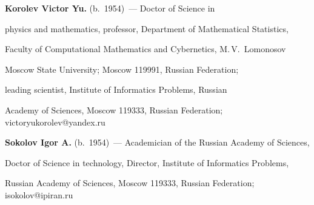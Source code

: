 \noindent


\textbf{Korolev Victor Yu.} (b.\ 1954)~--- Doctor of Science in 


physics and mathematics, professor, Department of Mathematical Statistics, 


Faculty of Computational Mathematics and Cybernetics, M.\,V.~Lomonosov


 Moscow State University; Moscow 119991, Russian Federation;


 leading scientist, Institute of Informatics Problems, Russian 


Academy of Sciences, Moscow 119333, Russian Federation; victoryukorolev@yandex.ru 





\vspace*{3pt}





\noindent


\textbf{Sokolov Igor A.} (b.\ 1954)~--- Academician of the Russian Academy of Sciences, 


Doctor of Science in technology, Director, Institute of Informatics Problems, 


Russian Academy of Sciences, Moscow 119333, Russian Federation;  isokolov@ipiran.ru 





 \label{end\stat}





\renewcommand{\bibname}{\protect\rm Литература}  



